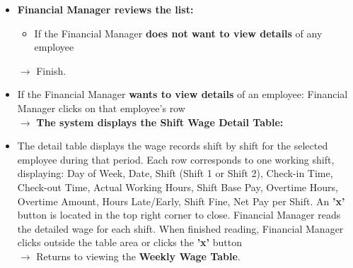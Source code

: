 \begin{itemize}
\begin{itemize}
\begin{itemize}
\begin{itemize}
                \begin{itemize}
                    \item Total Actual Working Hours (Week) = sum of Actual Working Hours of all shifts.
                    \item Total Shift Base Pay (Week) = sum of Shift Base Pay of all shifts.
                    \item Total Overtime Hours (Week) = sum of Overtime Hours of all shifts.
                    \item Total Late/Early Hours (Week) = sum of Hours Late/Early of all shifts.
                    \item Total Fines (Week) = sum of Shift Fine of all shifts.
                    \item Total Net Pay (Week) = sum of Net Pay per Shift of all shifts.
                \end{itemize}
            \end{itemize}
        \end{itemize}
        
        \item \textbf{The system sorts the results:} The employee list is sorted according to the \textbf{Alphabetical Sorting Rule} (A--Z by Employee Name)
    \end{itemize}
    $\rightarrow$ \textbf{The system displays the Weekly Wage Table} on screen: The table displays one row per employee, showing: Employee Code, Employee Name, Employee Phone Number, Total Actual Working Hours (Week), Total Shift Base Pay (Week), Total Overtime Amount Hours (Week), Total Late/Early Hours (Week), Total Fines (Week), Total Net Pay (Week).

    \item \textbf{Financial Manager reviews the list:}
    \begin{itemize}
        \item If the Financial Manager \textbf{does not want to view details} of any employee
    \end{itemize}
    $\rightarrow$ Finish.

    \item If the Financial Manager \textbf{wants to view details} of an employee: Financial Manager clicks on that employee's row\\
    $\rightarrow$ \textbf{The system displays the Shift Wage Detail Table:}

    \item The detail table displays the wage records shift by shift for the selected employee during that period. Each row corresponds to one working shift, displaying: Day of Week, Date, Shift (Shift 1 or Shift 2), Check-in Time, Check-out Time, Actual Working Hours, Shift Base Pay, Overtime Hours, Overtime Amount, Hours Late/Early, Shift Fine, Net Pay per Shift. An \textbf{'x'} button is located in the top right corner to close. Financial Manager reads the detailed wage for each shift. When finished reading, Financial Manager clicks outside the table area or clicks the \textbf{'x'} button\\
    $\rightarrow$ Returns to viewing the \textbf{Weekly Wage Table}.


\end{itemize}
